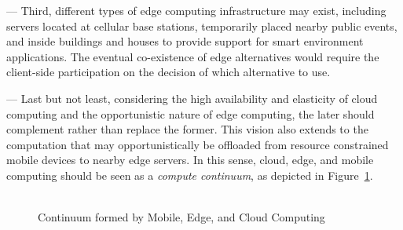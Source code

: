 
--- Third, different types of edge computing infrastructure may exist, including servers located at cellular base stations, temporarily placed nearby public events, and inside buildings and houses to provide support for smart environment applications. The eventual co-existence of edge alternatives would require the client-side participation on the decision of which alternative to use.

--- Last but not least, considering the high availability and elasticity of cloud computing and the opportunistic nature of edge computing, the later should complement rather than replace the former. This vision also extends to the computation that may opportunistically be offloaded from resource constrained mobile devices to nearby edge servers. In this sense, cloud, edge, and mobile computing should be seen as a \textit{compute continuum}, as depicted in Figure~\ref{fig:continuum-intro}.

\begin{figure}[tbp]
	\includegraphics[width=0.0\textwidth]{figs/continuum.png}
	\caption{Continuum formed by Mobile, Edge, and Cloud Computing}
	\label{fig:continuum-intro}
\end{figure}

 




